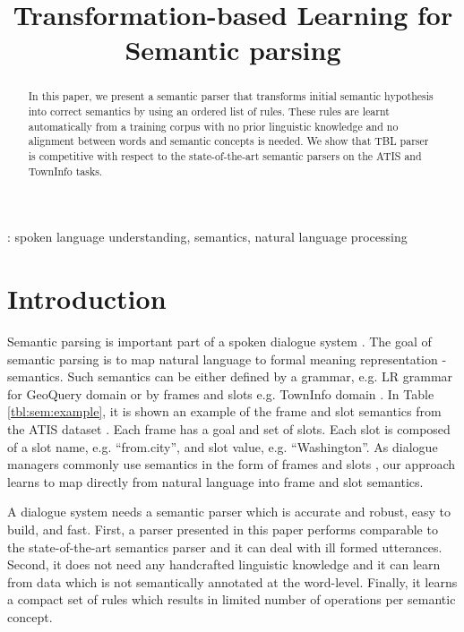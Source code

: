 \documentclass{article}
\title{Transformation-based Learning for Semantic parsing}
\begin{document}
\maketitle
%
\begin{abstract}
In this paper, we present a semantic parser that transforms initial semantic hypothesis into correct semantics by using an ordered list of rules. These rules are learnt automatically from a training corpus with no prior linguistic knowledge and no alignment between words and semantic concepts is needed. We show that TBL parser is competitive with respect to the state-of-the-art semantic parsers on the ATIS and TownInfo tasks.
\end{abstract}
\vspace{0.1cm}
: spoken language understanding, semantics, natural language processing


\section{Introduction}
Semantic parsing is important part of a spoken dialogue system \cite{williams07}. The goal of semantic parsing is to map natural language to formal meaning representation - semantics. Such semantics can be either defined by a grammar, e.g. LR grammar for GeoQuery domain \cite{kate05} or by frames and slots e.g. TownInfo domain \cite{thomson08}. In Table \ref{tbl:sem:example}, it is shown an example of the frame and slot semantics from the ATIS dataset \cite{atis94}. Each frame has a goal and set of slots. Each slot is composed of a slot name, e.g. ``from.city'',
and slot value, e.g. ``Washington''. As dialogue managers commonly use semantics in the form of frames and slots \cite{williams07,thomson08}, our approach learns to map directly from natural language into frame and slot semantics.



A dialogue system needs a semantic parser which is accurate and robust, easy to build, and fast. First, a parser presented in this paper performs comparable to the state-of-the-art semantics parser and it can deal with ill formed utterances. Second, it does not need any handcrafted linguistic knowledge and it can learn from data which is not semantically annotated at the word-level. Finally, it learns a compact set of rules which results in limited number of operations per semantic concept.
\end{document}
